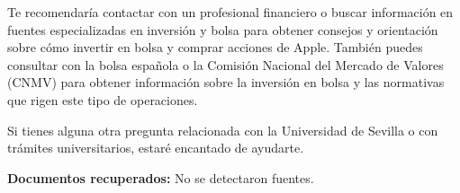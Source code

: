 \documentclass{article}
\begin{document}
\begin{itemize}
\begin{respuesta_agente}
Te recomendaría contactar con un profesional financiero o buscar información en fuentes especializadas en inversión y bolsa para obtener consejos y orientación sobre cómo invertir en bolsa y comprar acciones de Apple. También puedes consultar con la bolsa española o la Comisión Nacional del Mercado de Valores (CNMV) para obtener información sobre la inversión en bolsa y las normativas que rigen este tipo de operaciones.

Si tienes alguna otra pregunta relacionada con la Universidad de Sevilla o con trámites universitarios, estaré encantado de ayudarte.
    \end{respuesta_agente}
    \vspace{0.2cm}
    \noindent\textbf{Documentos recuperados:} No se detectaron fuentes.

\end{itemize}
\end{document}
